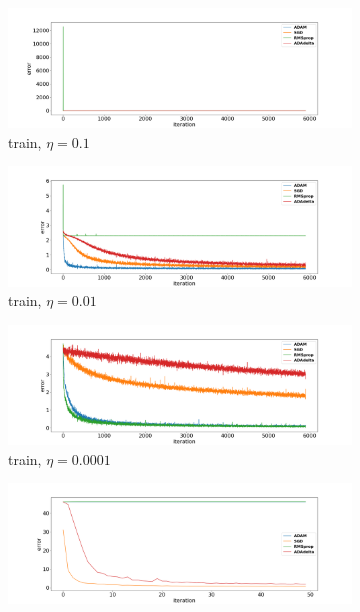 \documentclass[10pt,a4paper]{article}
\begin{document}
\begin{figure}
     \centering
     \begin{subfigure}[b]{0.3\textwidth}
         \centering
         \includegraphics[width=1.5\textwidth]{train_lr=0.1.png}
         \caption{train, $\eta = 0.1$}
         \label{fig: $\eta = 0.1$}
     \end{subfigure}
     \hfill
     \begin{subfigure}[b]{0.3\textwidth}
         \centering
         \includegraphics[width=1.5\textwidth]{train_lr=0.01.png}
         \caption{train, $\eta = 0.01$}
         \label{fig:$\eta = 0.01$}
     \end{subfigure}
     \hfill
     \begin{subfigure}[b]{0.3\textwidth}
         \centering
         \includegraphics[width=1.5\textwidth]{train_lr=0.0001.png}
         \caption{train, $\eta = 0.0001$}
         \label{fig:$\eta = 0.0001$}
     \end{subfigure}
     \hfill
     \begin{subfigure}[b]{0.3\textwidth}
         \centering
         \includegraphics[width=1.5\textwidth]{test_lr=0.1.png}

\end{subfigure}
\end{figure}
\end{document}
